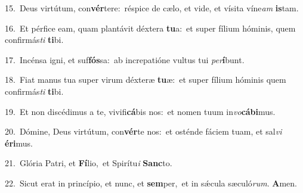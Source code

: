 {\numbfont\textcolor{\numbcolor}{15.}}~Deus virtútum, con\-\textbf{vér}\-tere:~\star réspice de cælo, et vide, et vísita víne\textit{am} \textbf{is}\-tam.\par
{\numbfont\textcolor{\numbcolor}{16.}}~Et pérfice eam, quam plantávit déxtera \textbf{tu}\-a:~\star et super fílium hóminis, quem confirmás\textit{ti} \textbf{ti}\-bi.\par
{\numbfont\textcolor{\numbcolor}{17.}}~Incénsa igni, et suf\-\textbf{fós}\-sa:~\star ab increpatióne vultus tui \textit{per}\-\textbf{í}bunt.\par
{\numbfont\textcolor{\numbcolor}{18.}}~Fiat manus tua super virum déxteræ \textbf{tu}\-æ:~\star et super fílium hóminis quem confirmás\textit{ti} \textbf{ti}\-bi.\par
{\numbfont\textcolor{\numbcolor}{19.}}~Et non discédimus a te, vivifi\-\textbf{cá}\-bis nos:~\star et nomen tuum in\-\textit{vo}\-\textbf{cá}\textbf{bi}mus.\par
{\numbfont\textcolor{\numbcolor}{20.}}~Dómine, Deus virtútum, con\-\textbf{vér}\-te nos:~\star et osténde fáciem tuam, et sal\textit{vi} \textbf{é}\-\textbf{ri}mus.\par
{\numbfont\textcolor{\numbcolor}{21.}}~Glória Patri, et \textbf{Fí}\-lio,~\star et Spirítu\textit{i} \textbf{Sanc}\-to.\par
{\numbfont\textcolor{\numbcolor}{22.}}~Sicut erat in princípio, et nunc, et \textbf{sem}\-per,~\star et in sǽcula sæculó\-\textit{rum}\-. \textbf{A}\-men.\par
